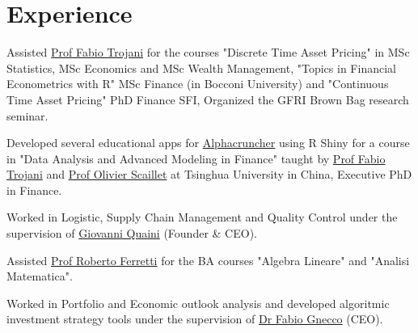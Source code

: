 \documentclass[]{deedy-resume-openfont}
\begin{document}
\begin{minipage}[t]{0.66\textwidth} 


\section{Experience}

\vspace{\topsep} 
Assisted \href{http://www.people.usi.ch/trojanif/}{Prof Fabio Trojani} for the 
courses "Discrete Time Asset Pricing"
in MSc Statistics, MSc Economics and MSc Wealth Management,
"Topics in Financial Econometrics with R" MSc Finance (in Bocconi University) and
"Continuous Time Asset Pricing" PhD Finance SFI,
Organized the GFRI Brown Bag research seminar.
\sectionsep

Developed several educational apps for \href{http://alphacruncher.com/}{Alphacruncher} 
using R Shiny for a course in "Data Analysis and Advanced Modeling in Finance" taught by 
\href{http://www.people.usi.ch/trojanif/}{Prof Fabio Trojani}
and \href{http://www.scaillet.ch/Home_Page_of_Olivier_Scaillet.htm}{Prof Olivier Scaillet}
at Tsinghua University in China, Executive PhD in Finance.
\sectionsep

Worked in Logistic, Supply Chain Management and Quality Control under the supervision
of \href{mailto:gio.quaini@gmail.com}{Giovanni Quaini} (Founder \& CEO).
\sectionsep

Assisted \href{https://www.linkedin.com/in/roberto-ferretti-975697a/}{Prof Roberto Ferretti} 
for the BA courses "Algebra Lineare" and "Analisi Matematica".
\sectionsep

Worked in Portfolio and Economic outlook analysis and
developed algoritmic investment strategy tools under the supervision of
\href{https://www.linkedin.com/in/fabio-gnecco-172b156/}{Dr Fabio Gnecco} (CEO).
\sectionsep


\end{minipage}
\end{document}

